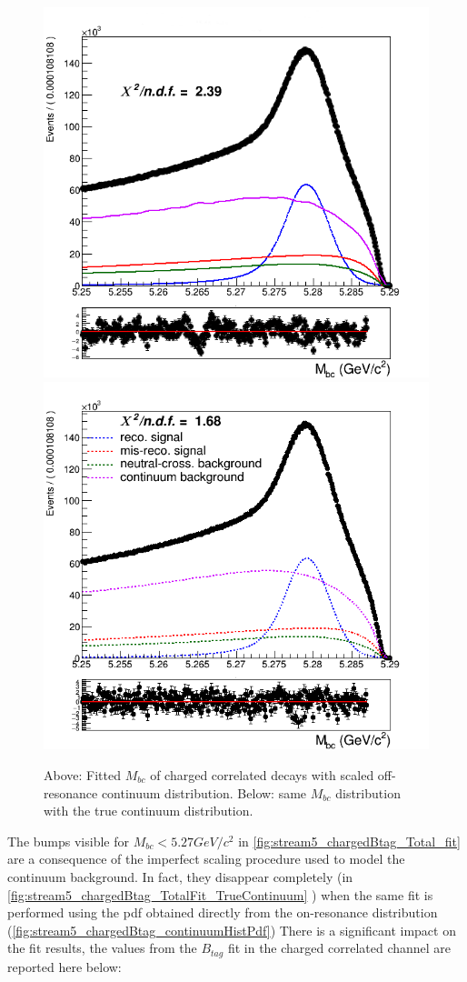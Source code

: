 \begin{figure}[H]
    \centering
    \subcaptionbox{\label{fig:stream5_chargedBtag_Total_fit}}
    {\includegraphics[width=.65\textwidth]{07-LamBR/figs/stream5_chargedBtag_Total_fit.png}} 
    \subcaptionbox{\label{fig:stream5_chargedBtag_TotalFit_TrueContinuum}}
    {\includegraphics[width=.65\textwidth]{07-LamBR/figs/NEW_stream5_chargedBtag_Total_fit_sigmaCB_misReco_Tail_free_usingTrueContinuumPDF_370bins.png}} 
    \caption{Above: Fitted $M_{bc}$ of charged correlated decays with scaled off-resonance continuum distribution. 
    Below: same $M_{bc}$ distribution with the true continuum distribution.}
    \end{figure}
  
The bumps visible for  $M_{bc} < 5.27 GeV/c^2$ in \cref{fig:stream5_chargedBtag_Total_fit}   
are a consequence of the imperfect scaling procedure used to model the continuum background. In fact, 
they disappear completely (in \cref{fig:stream5_chargedBtag_TotalFit_TrueContinuum} ) when the same fit is performed using 
the pdf obtained directly from the on-resonance distribution (\cref{fig:stream5_chargedBtag_continuumHistPdf})
There is a significant impact on the fit results, the values from the  $B_{tag}$ fit in the charged correlated channel are reported here below:

